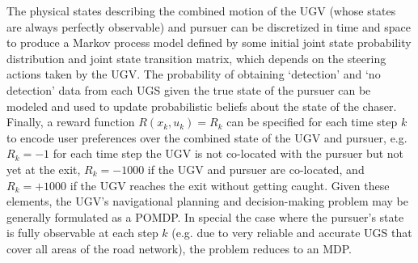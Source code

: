 The physical states describing the combined motion of the UGV (whose states are always perfectly observable) and pursuer can be discretized in time and space to produce a Markov process model defined by some initial joint state probability distribution and joint state transition matrix, which depends on the steering actions taken by the UGV. The probability of obtaining `detection' and `no detection' data from each UGS given the true state of the pursuer can be modeled and used to update probabilistic beliefs about the state of the chaser. Finally, a reward function $R(x_k,u_k) = R_k$ can be specified for each time step $k$ to encode user preferences over the combined state of the UGV and pursuer, e.g. $R_k = -1$ for each time step the UGV is not co-located with the pursuer but not yet at the exit, $R_k= -1000$ if the UGV and pursuer are co-located, and $R_k=+1000$ if the UGV reaches the exit without getting caught. Given these elements, the UGV's navigational planning and decision-making problem may be generally formulated as a POMDP. %
In special the case where the pursuer's state is fully observable at each step $k$ (e.g. due to very reliable and accurate UGS that cover all areas of the road network), the problem reduces to an MDP. 


